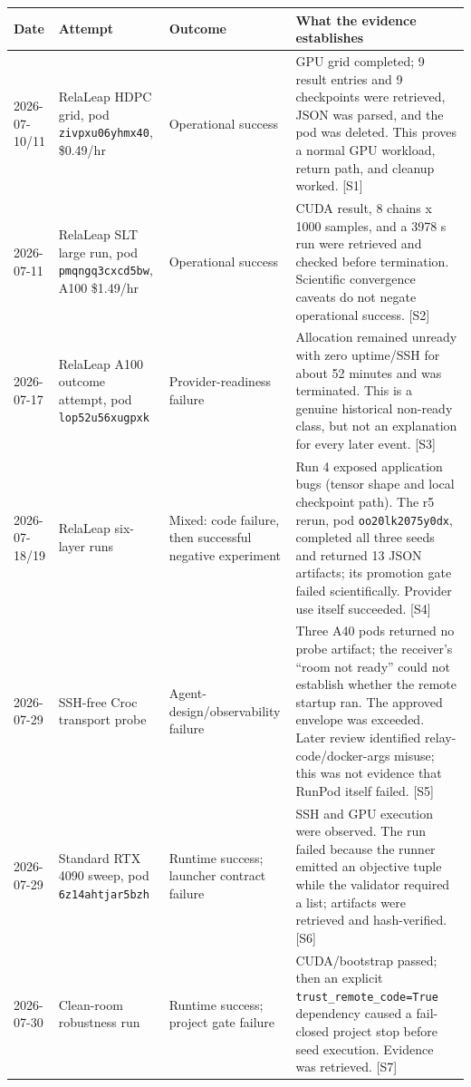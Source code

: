 \documentclass[10pt]{article}
\begin{document}
\small
\begin{longtable}{p{}p{}p{}p{}}
\toprule
Date & Attempt & Outcome & What the evidence establishes \\
\midrule
\endhead
2026-07-10/11 & RelaLeap HDPC grid, pod \texttt{zivpxu06yhmx40}, \$0.49/hr & Operational success & GPU grid completed; 9 result entries and 9 checkpoints were retrieved, JSON was parsed, and the pod was deleted. This proves a normal GPU workload, return path, and cleanup worked. [S1] \\
2026-07-11 & RelaLeap SLT large run, pod \texttt{pmqngq3cxcd5bw}, A100 \$1.49/hr & Operational success & CUDA result, 8 chains x 1000 samples, and a 3978 s run were retrieved and checked before termination. Scientific convergence caveats do not negate operational success. [S2] \\
2026-07-17 & RelaLeap A100 outcome attempt, pod \texttt{lop52u56xugpxk} & Provider-readiness failure & Allocation remained unready with zero uptime/SSH for about 52 minutes and was terminated. This is a genuine historical non-ready class, but not an explanation for every later event. [S3] \\
2026-07-18/19 & RelaLeap six-layer runs & Mixed: code failure, then successful negative experiment & Run 4 exposed application bugs (tensor shape and local checkpoint path). The r5 rerun, pod \texttt{oo20lk2075y0dx}, completed all three seeds and returned 13 JSON artifacts; its promotion gate failed scientifically. Provider use itself succeeded. [S4] \\
2026-07-29 & SSH-free Croc transport probe & Agent-design/observability failure & Three A40 pods returned no probe artifact; the receiver's ``room not ready'' could not establish whether the remote startup ran. The approved envelope was exceeded. Later review identified relay-code/docker-args misuse; this was not evidence that RunPod itself failed. [S5] \\
2026-07-29 & Standard RTX 4090 sweep, pod \texttt{6z14ahtjar5bzh} & Runtime success; launcher contract failure & SSH and GPU execution were observed. The run failed because the runner emitted an objective tuple while the validator required a list; artifacts were retrieved and hash-verified. [S6] \\
2026-07-30 & Clean-room robustness run & Runtime success; project gate failure & CUDA/bootstrap passed; then an explicit \texttt{trust\_remote\_code=True} dependency caused a fail-closed project stop before seed execution. Evidence was retrieved. [S7] \\

\end{longtable}
\end{document}
